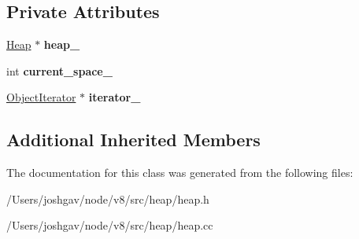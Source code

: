 \subsection*{Private Attributes}
\begin{DoxyCompactItemize}
\item 
\hyperlink{classv8_1_1internal_1_1_heap}{Heap} $\ast$ {\bfseries heap\+\_\+}\hypertarget{classv8_1_1internal_1_1_space_iterator_aedf11665ba57cfa810ac6f4d09f9820e}{}\label{classv8_1_1internal_1_1_space_iterator_aedf11665ba57cfa810ac6f4d09f9820e}

\item 
int {\bfseries current\+\_\+space\+\_\+}\hypertarget{classv8_1_1internal_1_1_space_iterator_a3c95b09c036fc8cf1463724cedf920e8}{}\label{classv8_1_1internal_1_1_space_iterator_a3c95b09c036fc8cf1463724cedf920e8}

\item 
\hyperlink{classv8_1_1internal_1_1_object_iterator}{Object\+Iterator} $\ast$ {\bfseries iterator\+\_\+}\hypertarget{classv8_1_1internal_1_1_space_iterator_ad2da1679c203f90c9f912fe2c9702f21}{}\label{classv8_1_1internal_1_1_space_iterator_ad2da1679c203f90c9f912fe2c9702f21}

\end{DoxyCompactItemize}
\subsection*{Additional Inherited Members}


The documentation for this class was generated from the following files\+:\begin{DoxyCompactItemize}
\item 
/\+Users/joshgav/node/v8/src/heap/heap.\+h\item 
/\+Users/joshgav/node/v8/src/heap/heap.\+cc\end{DoxyCompactItemize}
